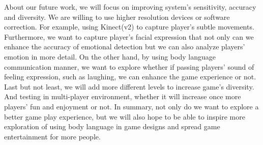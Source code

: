 About our future work, we will focus on improving system's sensitivity, accuracy and diversity. We are willing to use higher resolution devices or software correction. For example, using Kinect(v2) to capture player's subtle movements. Furthermore, we want to capture player's facial expression that not only can we enhance the accuracy of emotional detection but we can also analyze players' emotion in more detail.
On the other hand, by using body language communication manner, we want to explore whether if passing players' sound of feeling expression, such as laughing, we can enhance the game experience or not. Last but not least, we will add more different levels to increase game's diversity. And testing in multi-player environment, whether it will increase once more players' fun and enjoyment or not. In summary, not only do we want to explore a better game play experience, but we will also hope to be able to inspire more exploration of using body language in game designs and spread game entertainment for more people.


